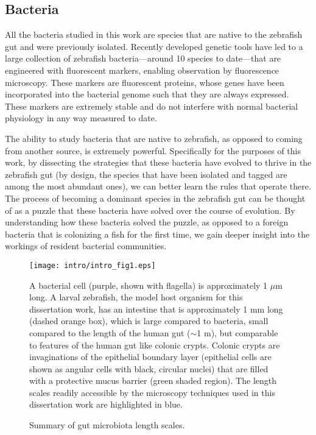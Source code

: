 \subsection{Bacteria}
All the bacteria studied in this work are species that are native to the zebrafish gut and were previously isolated. Recently developed genetic tools \cite{wiles_modernized_2018} have led to a large collection of zebrafish bacteria---around 10 species to date---that are engineered with fluorescent markers, enabling observation by fluorescence microscopy. These markers are fluorescent proteins, whose genes have been incorporated into the bacterial genome such that they are always expressed. These markers are extremely stable and do not interfere with normal bacterial physiology in any way measured to date. 

The ability to study bacteria that are native to zebrafish, as opposed to coming from another source, is extremely powerful. Specifically for the purposes of this work, by dissecting the strategies that these bacteria have evolved to thrive in the zebrafish gut (by design, the species that have been isolated and tagged are among the most abundant ones), we can better learn the rules that operate there. The process of becoming a dominant species in the zebrafish gut can be thought of as a puzzle that these bacteria have solved over the course of evolution. By understanding how these bacteria solved the puzzle, as opposed to a foreign bacteria that is colonizing a fish for the first time, we gain deeper insight into the workings of resident bacterial communities.

\begin{figure}%
	\centerline{
		\texttt{[image: intro/intro\_fig1.eps]}}
	\caption{Summary of gut microbiota length scales.} {A bacterial cell (purple, shown with flagella) is approximately 1 $\mu$m long. A larval zebrafish, the model host organism for this dissertation work, has an intestine that is approximately 1 mm long (dashed orange box), which is large compared to bacteria, small compared to the length of the human gut ($\sim$1 m), but comparable to features of the human gut like colonic crypts. Colonic crypts are invaginations of the epithelial boundary layer (epithelial cells are shown as angular cells with black, circular nuclei) that are filled with a protective mucus barrier (green shaded region). The length scales readily accessible by the microscopy techniques used in this dissertation work are highlighted in blue.}
\end{figure}

